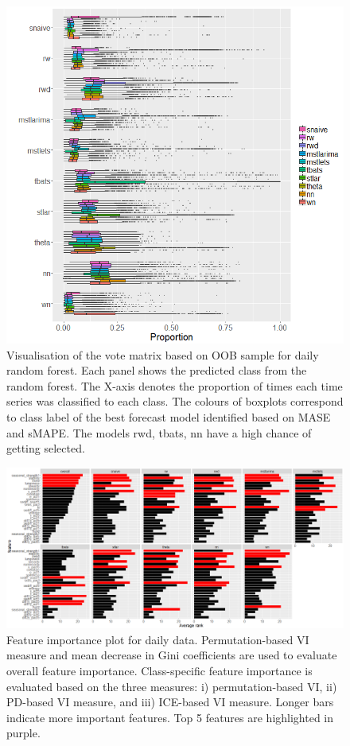 \documentclass[11pt,a4paper,]{article}
\begin{document}
\begin{figure}
\centering
\includegraphics{figures/oobdaily-1.png}
\caption{\label{fig:oobdaily}Visualisation of the vote matrix based on OOB sample for daily random forest. Each panel shows the predicted class from the random forest. The X-axis denotes the proportion of times each time series was classified to each class. The colours of boxplots correspond to class label of the best forecast model identified based on MASE and sMAPE. The models rwd, tbats, nn have a high chance of getting selected.}
\end{figure}

\clearpage

\begin{figure}[h]

{\centering \includegraphics{figures/vidaily-1} 

}

\caption{Feature importance plot for daily data. Permutation-based VI measure and mean decrease in Gini coefficients are used to evaluate overall feature importance. Class-specific feature importance is evaluated based on the three measures: i) permutation-based VI, ii) PD-based VI measure, and iii) ICE-based VI measure. Longer bars indicate more important features. Top 5 features are highlighted in purple.}\label{fig:vidaily}
\end{figure}
\end{document}
